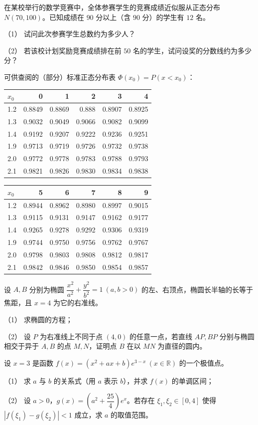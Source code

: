 \begin{question}
在某校举行的数学竞赛中，全体参赛学生的竞赛成绩近似服从正态分布 $N(70,100)$。已知成绩在 $90$ 分以上（含 $90$ 分）的学生有 $12$ 名。

（1） 试问此次参赛学生总数约为多少人？

（2） 若该校计划奖励竞赛成绩排在前 $50$ 名的学生，试问设奖的分数线约为多少分？

可供查阅的（部分）标准正态分布表 $\Phi(x_0)=P(x<x_0)$：

\begin{center}
\begin{tabular}{lrrrrr}
\toprule
$x_0$ & 0 & 1 & 2 & 3 & 4 \\
\midrule
1.2 & 0.8849 & 0.8869 & 0.888 & 0.8907 & 0.8925 \\
1.3 & 0.9032 & 0.9049 & 0.9066 & 0.9082 & 0.9099 \\
1.4 & 0.9192 & 0.9207 & 0.9222 & 0.9236 & 0.9251 \\
1.9 & 0.9713 & 0.9719 & 0.9726 & 0.9732 & 0.9738 \\
2.0 & 0.9772 & 0.9778 & 0.9783 & 0.9788 & 0.9793 \\
2.1 & 0.9821 & 0.9826 & 0.9830 & 0.9834 & 0.9838 \\
\bottomrule
\end{tabular}
\end{center}

\begin{center}
\begin{tabular}{lrrrrr}
\toprule
$x_0$ & 5 & 6 & 7 & 8 & 9 \\
\midrule
1.2 & 0.8944 & 0.8962 & 0.8980 & 0.8997 & 0.9015 \\
1.3 & 0.9115 & 0.9131 & 0.9147 & 0.9162 & 0.9177 \\
1.4 & 0.9265 & 0.9278 & 0.9292 & 0.9306 & 0.9319 \\
1.9 & 0.9744 & 0.9750 & 0.9756 & 0.9762 & 0.9767 \\
2.0 & 0.9798 & 0.9803 & 0.9808 & 0.9812 & 0.9817 \\
2.1 & 0.9842 & 0.9846 & 0.9850 & 0.9854 & 0.9857 \\
\bottomrule
\end{tabular}
\end{center}

\end{question}
\begin{question}
设 $A,B$ 分别为椭圆 $\dfrac{x^2}{a^2}+\dfrac{y^2}{b^2}=1\ (a,b>0)$ 的左、右顶点，椭圆长半轴的长等于焦距，且 $x=4$ 为它的右准线。

（1） 求椭圆的方程；

（2） 设 $P$ 为右准线上不同于点 $(4,0)$ 的任意一点，若直线 $AP,BP$ 分别与椭圆相交于异于 $A,B$ 的点 $M,N$，证明点 $B$ 在以 $MN$ 为直径的圆内。

\end{question}
\begin{question}
设 $x=3$ 是函数 $f(x)=(x^2+ax+b)e^{3-x}\ (x\in\mathbb R)$ 的一个极值点。

（1） 求 $a$ 与 $b$ 的关系式（用 $a$ 表示 $b$），并求 $f(x)$ 的单调区间；

（2） 设 $a>0$，$g(x)=\left(a^2+\dfrac{25}{4}\right)e^x$。若存在 $\xi_1,\xi_2\in[0,4]$ 使得 $|f(\xi_1)-g(\xi_2)|<1$ 成立，求 $a$ 的取值范围。

\end{question}
